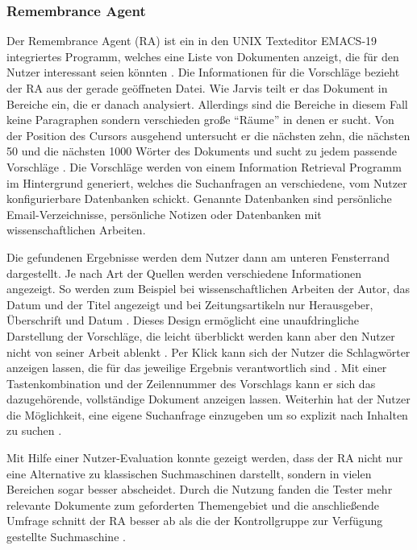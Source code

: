  	\subsubsection{Remembrance Agent}
 	Der Remembrance Agent (RA) ist ein in den UNIX Texteditor EMACS-19 integriertes Programm, welches eine Liste von Dokumenten anzeigt, die für den Nutzer interessant seien könnten \cite{rhodes2000thesis}. Die Informationen für die Vorschläge bezieht der RA aus der gerade geöffneten Datei. Wie Jarvis teilt er das Dokument in Bereiche ein, die er danach analysiert. Allerdings sind die Bereiche in diesem Fall keine Paragraphen sondern verschieden große ``Räume'' in denen er sucht. Von der Position des Cursors ausgehend untersucht er die nächsten zehn, die nächsten 50 und die nächsten 1000 Wörter des Dokuments und sucht zu jedem passende Vorschläge \cite{rhodes1996remembrance}. Die Vorschläge werden von einem Information Retrieval Programm im Hintergrund generiert, welches die Suchanfragen an verschiedene, vom Nutzer konfigurierbare Datenbanken schickt. Genannte Datenbanken sind persönliche Email-Verzeichnisse, persönliche Notizen oder Datenbanken mit wissenschaftlichen Arbeiten.

 	Die gefundenen Ergebnisse werden dem Nutzer dann am unteren Fensterrand dargestellt. Je nach Art der Quellen werden verschiedene Informationen angezeigt. So werden zum Beispiel bei wissenschaftlichen Arbeiten der Autor, das Datum und der Titel angezeigt und bei Zeitungsartikeln nur Herausgeber, Überschrift und Datum \cite{rhodes2000just}. Dieses Design ermöglicht eine unaufdringliche Darstellung der Vorschläge, die leicht überblickt werden kann aber den Nutzer nicht von seiner Arbeit ablenkt \cite{rhodes1996remembrance}. Per Klick kann sich der Nutzer die Schlagwörter anzeigen lassen, die für das jeweilige Ergebnis verantwortlich sind \cite{rhodes2000thesis}. Mit einer Tastenkombination und der Zeilennummer des Vorschlags kann er sich das dazugehörende, vollständige Dokument anzeigen lassen. Weiterhin hat der Nutzer die Möglichkeit, eine eigene Suchanfrage einzugeben um so explizit nach Inhalten zu suchen \cite{rhodes1996remembrance}.

 	Mit Hilfe einer Nutzer-Evaluation konnte gezeigt werden, dass der RA nicht nur eine Alternative zu klassischen Suchmaschinen darstellt, sondern in vielen Bereichen sogar besser abscheidet. Durch die Nutzung fanden die Tester mehr relevante Dokumente zum geforderten Themengebiet und die anschließende Umfrage schnitt der RA besser ab als die der Kontrollgruppe zur Verfügung gestellte Suchmaschine \cite{rhodes2000just}.

